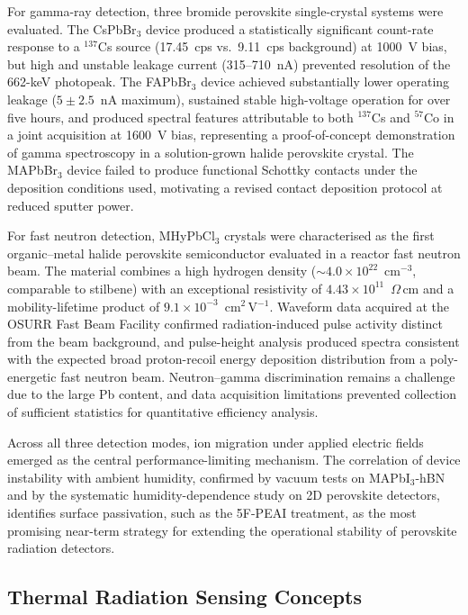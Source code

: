 For gamma-ray detection, three bromide perovskite single-crystal
systems were evaluated.  The CsPbBr$_3$ device produced a
statistically significant count-rate response to a $^{137}$Cs source
(17.45~cps vs.\ 9.11~cps background) at 1000~V bias, but high and
unstable leakage current (315--710~nA) prevented resolution of the
662-keV photopeak.  The FAPbBr$_3$ device achieved substantially lower
operating leakage ($5 \pm 2.5$~nA maximum), sustained stable
high-voltage operation for over five hours, and produced spectral
features attributable to both $^{137}$Cs and $^{57}$Co in a joint
acquisition at 1600~V bias, representing a proof-of-concept
demonstration of gamma spectroscopy in a solution-grown halide
perovskite crystal.  The MAPbBr$_3$ device failed to produce
functional Schottky contacts under the deposition conditions used,
motivating a revised contact deposition protocol at reduced sputter
power.

For fast neutron detection, MHyPbCl$_3$ crystals were characterised as
the first organic--metal halide perovskite semiconductor evaluated in a
reactor fast neutron beam.  The material combines a high hydrogen
density ($\sim 4.0 \times 10^{22}$~cm$^{-3}$, comparable to stilbene)
with an exceptional resistivity of
$4.43 \times 10^{11}$~$\Omega$\,cm and a mobility-lifetime product of
$9.1 \times 10^{-3}$~cm$^2$\,V$^{-1}$.  Waveform data acquired at
the OSURR Fast Beam Facility confirmed radiation-induced pulse
activity distinct from the beam background, and pulse-height analysis
produced spectra consistent with the expected broad proton-recoil
energy deposition distribution from a poly-energetic fast neutron beam.
Neutron--gamma discrimination remains a challenge due to the large
Pb content, and data acquisition limitations prevented collection of
sufficient statistics for quantitative efficiency analysis.

Across all three detection modes, ion migration under applied electric
fields emerged as the central performance-limiting mechanism.  The
correlation of device instability with ambient humidity, confirmed by
vacuum tests on MAPbI$_3$-hBN and by the systematic
humidity-dependence study on 2D perovskite detectors, identifies
surface passivation, such as the 5F-PEAI treatment, as the most
promising near-term strategy for extending the operational stability
of perovskite radiation detectors.


\subsection{Thermal Radiation Sensing Concepts}

